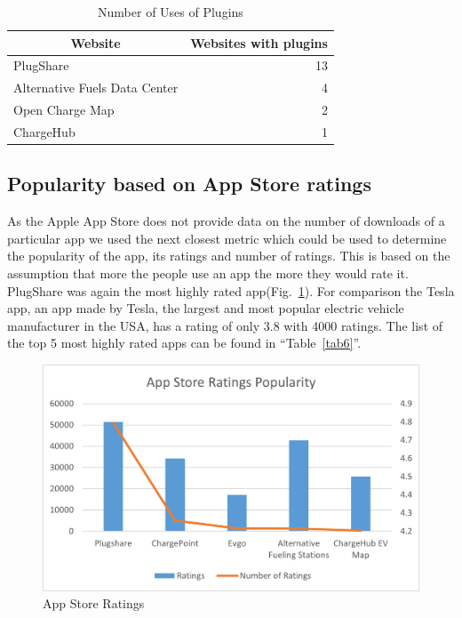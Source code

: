 \documentclass[conference]{IEEEtran}
\begin{document}
\begin{table}[htbp]
\caption{Number of Uses of Plugins}
\begin{center}
\begin{tabular}{|l|r|}
\hline
\multicolumn{1}{|c|}{\textbf{Website}} & \multicolumn{1}{c|}{\textbf{Websites with plugins}} \\ \hline
PlugShare & 13 \\
Alternative Fuels Data Center & 4 \\
Open Charge Map & 2 \\
ChargeHub & 1 \\ \hline
\end{tabular}
\label{tab5}
\end{center}
\end{table}

\subsection{Popularity based on App Store ratings}
As the Apple App Store does not provide data on the number of downloads of a particular app we used the next closest metric which could be used to determine the popularity of the app, its ratings and number of ratings. This is based on the assumption that more the people use an app the more they would rate it. PlugShare was again the most highly rated app(Fig.~\ref{fig7}). For comparison the Tesla app, an app made by Tesla, the largest and most popular electric vehicle manufacturer in the USA, has a rating of only 3.8 with 4000 ratings. The list of the top 5 most highly rated apps can be found in ``Table~\ref{tab6}''.

\begin{figure}[htbp]
\centerline{\includegraphics[width=\columnwidth]{Picture7.png}}
\caption{App Store Ratings}
\label{fig7}
\end{figure}
\end{document}
